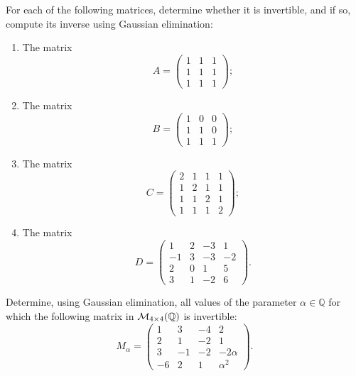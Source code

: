 \begin{exercise}
\label{exc:explicit_inversion_matrices}
For each of the following matrices, determine whether it is invertible, and if so, compute its inverse using Gaussian elimination:
\begin{enumerate}
    \item The matrix
    \[
    A = \begin{pmatrix} 1 & 1 & 1 \\ 1 & 1 & 1 \\ 1 & 1 & 1 \end{pmatrix};
    \]
    \item The matrix
    \[
    B = \begin{pmatrix} 1 & 0 & 0 \\ 1 & 1 & 0 \\ 1 & 1 & 1 \end{pmatrix};
    \]
    \item The matrix
    \[
    C = \begin{pmatrix} 2 & 1 & 1 & 1 \\ 1 & 2 & 1 & 1 \\ 1 & 1 & 2 & 1 \\ 1 & 1 & 1 & 2 \end{pmatrix};
    \]
    \item The matrix
    \[
    D = \begin{pmatrix} 1 & 2 & -3 & 1 \\ -1 & 3 & -3 & -2 \\ 2 & 0 & 1 & 5 \\ 3 & 1 & -2 & 6 \end{pmatrix}.
    \]
\end{enumerate}
\end{exercise}

\begin{exercise}
\label{exc:parametric_gaussian_elimination_invertibility}
Determine, using Gaussian elimination, all values of the parameter $\alpha \in \mathbb{Q}$ for which the following matrix in $\mathcal{M}_{4 \times 4}(\mathbb{Q})$ is invertible:
\[
M_\alpha = \begin{pmatrix}
1 & 3 & -4 & 2 \\
2 & 1 & -2 & 1 \\
3 & -1 & -2 & -2\alpha \\
-6 & 2 & 1 & \alpha^2
\end{pmatrix}.
\]
\end{exercise}

